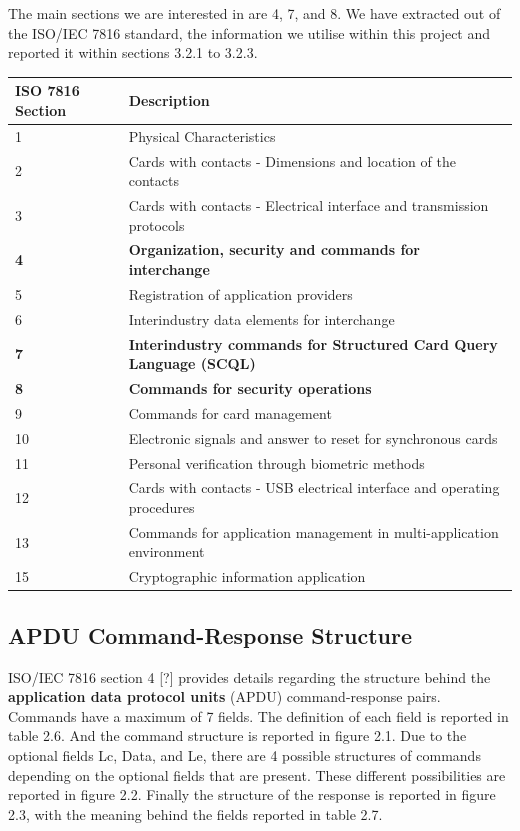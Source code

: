 \documentclass[bsc,frontabs,twoside,singlespacing,parskip,deptreport]{infthesis}     %
\begin{document}
The main sections we are interested in are 4, 7, and 8. We have extracted out of the ISO/IEC 7816 standard, the information we utilise within this project and reported it within sections 3.2.1 to 3.2.3.

\begin{table}[H]
\begin{tabular}{|l|p{12cm}|}
\hline
ISO 7816 Section & Description\\
\hline
1 & Physical Characteristics \\
\hline
2 & Cards with contacts - Dimensions and location of the contacts \\
\hline
3 & Cards with contacts - Electrical interface and transmission protocols \\
\hline
\textbf{4}  & \textbf{Organization, security and commands for interchange} \\
\hline
5 & Registration of application providers \\
\hline
6 & Interindustry data elements for interchange \\
\hline
\textbf{7} & \textbf{Interindustry commands for Structured Card Query Language (SCQL)} \\
\hline
\textbf{8} & \textbf{Commands for security operations} \\
\hline
9 & Commands for card management \\
\hline
10 & Electronic signals and answer to reset for synchronous cards \\
\hline
11 & Personal verification through biometric methods \\
\hline
12 & Cards with contacts - USB electrical interface and operating procedures \\
\hline
13 & Commands for application management in multi-application environment \\
\hline
15 & Cryptographic information application \\
\hline
\end{tabular}
\end{table}


\subsection{APDU Command-Response Structure}

ISO/IEC 7816 section 4 [?] provides details regarding the structure behind the \textbf{application data protocol units} (APDU) command-response pairs. Commands have a maximum of 7 fields. The definition of each field is reported in table 2.6.  And the command structure is reported in figure 2.1. Due to the optional fields Lc, Data, and Le, there are 4 possible structures of commands depending on the optional fields that are present. These different possibilities are reported in figure 2.2. Finally the structure of the response is reported in figure 2.3, with the meaning behind the fields reported in table 2.7.
\end{document}
